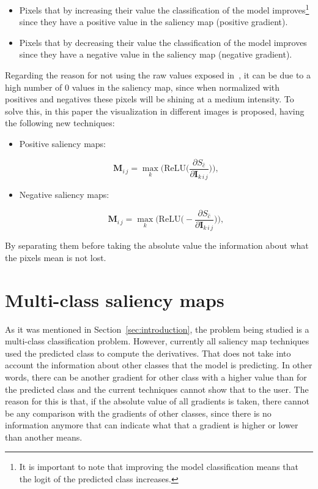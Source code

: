 \documentclass[preprint,12pt]{elsarticle}
\begin{document}
\begin{itemize}
    \item Pixels that by increasing their value the classification of the model improves\footnote{It is important to note that improving the model classification means that the logit of the predicted class increases. } since they have a positive value in the saliency map (positive gradient).
    \item Pixels that by decreasing their value the classification of the model improves since they have a negative value in the saliency map (negative gradient).
\end{itemize}

Regarding the reason for not using the raw values exposed in~\cite{Smilkov2017}, it can be due to a high number of 0 values in the saliency map, since when normalized with positives and negatives these pixels will be shining at a medium intensity. To solve this, in this paper the visualization in different images is proposed, having the following new techniques:

\begin{itemize}
    \item Positive saliency maps:
    
    \begin{equation}
        \boldsymbol{M}_{i\, j} = \max_{k} \bigg ( \text{ReLU} \bigg (\frac{\partial S_{\hat{c}}}{\partial \boldsymbol{I}_{k\, i\, j}} \bigg ) \bigg ),
        \label{eq: positive saliency map}
    \end{equation}

    \item Negative saliency maps:
    
    \begin{equation}
      \boldsymbol{M}_{i\, j} = \max_{k} \bigg ( \text{ReLU} \bigg ( - \frac{\partial S_{\hat{c}}}{\partial \boldsymbol{I}_{k\, i\, j}} \bigg ) \bigg ),
      \label{eq: negative saliency map}
  \end{equation}

\end{itemize}

By separating them before taking the absolute value the information about what the pixels mean is not lost. 

\section{Multi-class saliency maps}
\label{sec:multi-class saliency map}
As it was mentioned in Section~\ref{sec:introduction}, the problem being studied is a multi-class classification problem. However, currently all saliency map techniques used the predicted class to compute the derivatives. That does not take into account the information about other classes that the model is predicting. In other words, there can be another gradient for other class with a higher value than for the predicted class and the current techniques cannot show that to the user. The reason for this is that, if the absolute value of all gradients is taken, there cannot be any comparison with the gradients of other classes, since there is no information anymore that can indicate what that a gradient is higher or lower than another means.
\end{document}
